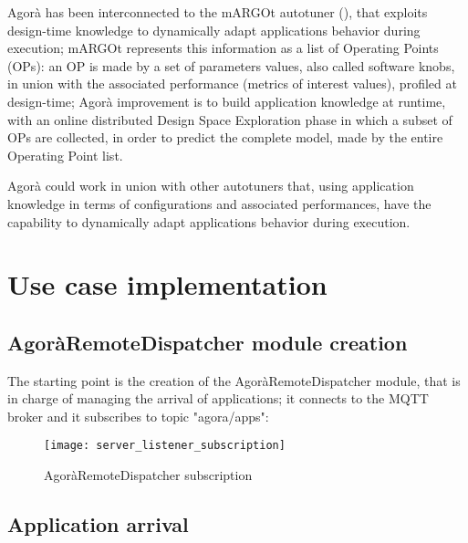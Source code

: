 Agorà has been interconnected to the mARGOt autotuner (\cite{gadioli2015application}), that exploits design-time knowledge to dynamically adapt applications behavior during execution; mARGOt represents this information as a list of Operating Points (OPs): an OP is made by a set of parameters values, also called software knobs, in union with the associated performance (metrics of interest values), profiled at design-time; Agorà improvement is to build application knowledge at runtime, with an online distributed Design Space Exploration phase in which a subset of OPs are collected, in order to predict the complete model, made by the entire Operating Point list.

Agorà could work in union with other autotuners that, using application knowledge in terms of configurations and associated performances, have the capability to dynamically adapt applications behavior during execution.










\section{Use case implementation}





\subsection{AgoràRemoteDispatcher module creation}

The starting point is the creation of the AgoràRemoteDispatcher module, that is in charge of managing the arrival of applications; it connects to the MQTT broker and it subscribes to topic "agora/apps":

\begin{figure}[H]

    \centering
    \texttt{[image: server\_listener\_subscription]}
    \caption{AgoràRemoteDispatcher subscription}
    
\end{figure}





\subsection{Application arrival}

